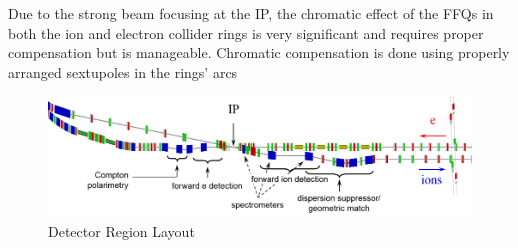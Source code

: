 Due to the strong beam focusing at the IP, the chromatic effect of the FFQs in both the ion and electron collider rings is very significant and requires proper compensation but is manageable. Chromatic compensation is done using properly arranged sextupoles in the rings’ arcs %

\begin{figure}
	\centering
	\includegraphics[width=.75\textwidth]{../../img/detector_region_layout}
	\caption{Detector Region Layout}
	\label{fig:detector_region_layout}
\end{figure}
